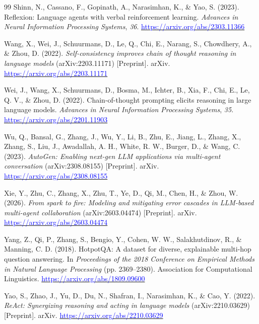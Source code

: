 \documentclass[11pt]{article}
\begin{document}
\begin{thebibliography}{99}
Shinn, N., Cassano, F., Gopinath, A., Narasimhan, K., \& Yao, S. (2023). Reflexion:
Language agents with verbal reinforcement learning. \textit{Advances in Neural Information
Processing Systems}, \textit{36}.
\href{https://arxiv.org/abs/2303.11366}{\textcolor{blue}{https://arxiv.org/abs/2303.11366}}

Wang, X., Wei, J., Schuurmans, D., Le, Q., Chi, E., Narang, S., Chowdhery, A., \& Zhou, D.
(2022). \textit{Self-consistency improves chain of thought reasoning in language models}
(arXiv:2203.11171) [Preprint]. arXiv.
\href{https://arxiv.org/abs/2203.11171}{\textcolor{blue}{https://arxiv.org/abs/2203.11171}}

Wei, J., Wang, X., Schuurmans, D., Bosma, M., Ichter, B., Xia, F., Chi, E., Le, Q. V., \&
Zhou, D. (2022). Chain-of-thought prompting elicits reasoning in large language models.
\textit{Advances in Neural Information Processing Systems}, \textit{35}.
\href{https://arxiv.org/abs/2201.11903}{\textcolor{blue}{https://arxiv.org/abs/2201.11903}}

Wu, Q., Bansal, G., Zhang, J., Wu, Y., Li, B., Zhu, E., Jiang, L., Zhang, X., Zhang, S.,
Liu, J., Awadallah, A. H., White, R. W., Burger, D., \& Wang, C. (2023).
\textit{AutoGen: Enabling next-gen LLM applications via multi-agent conversation}
(arXiv:2308.08155) [Preprint]. arXiv.
\href{https://arxiv.org/abs/2308.08155}{\textcolor{blue}{https://arxiv.org/abs/2308.08155}}

Xie, Y., Zhu, C., Zhang, X., Zhu, T., Ye, D., Qi, M., Chen, H., \& Zhou, W. (2026).
\textit{From spark to fire: Modeling and mitigating error cascades in LLM-based multi-agent
collaboration} (arXiv:2603.04474) [Preprint]. arXiv.
\href{https://arxiv.org/abs/2603.04474}{\textcolor{blue}{https://arxiv.org/abs/2603.04474}}

Yang, Z., Qi, P., Zhang, S., Bengio, Y., Cohen, W. W., Salakhutdinov, R., \& Manning, C. D.
(2018). HotpotQA: A dataset for diverse, explainable multi-hop question answering. In
\textit{Proceedings of the 2018 Conference on Empirical Methods in Natural Language
Processing} (pp. 2369--2380). Association for Computational Linguistics.
\href{https://arxiv.org/abs/1809.09600}{\textcolor{blue}{https://arxiv.org/abs/1809.09600}}

Yao, S., Zhao, J., Yu, D., Du, N., Shafran, I., Narasimhan, K., \& Cao, Y. (2022).
\textit{ReAct: Synergizing reasoning and acting in language models} (arXiv:2210.03629)
[Preprint]. arXiv.
\href{https://arxiv.org/abs/2210.03629}{\textcolor{blue}{https://arxiv.org/abs/2210.03629}}


\end{thebibliography}
\end{document}

